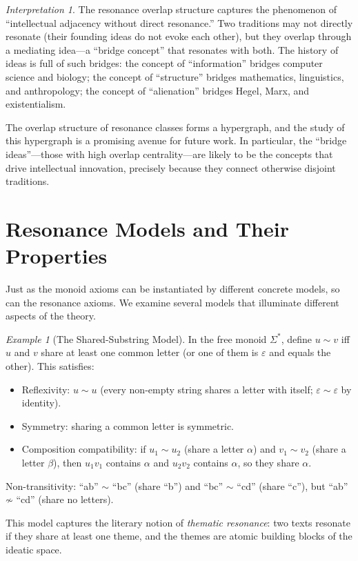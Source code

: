\documentclass[11pt,openany]{book}
\theoremstyle{definition}
\theoremstyle{plain}
\theoremstyle{remark}
\newtheorem{example}[axiom]{Example}
\newtheorem{interpretation}[axiom]{Interpretation}
\newcommand{\res}{\sim}                      %
\begin{document}
\begin{interpretation}
The resonance overlap structure captures the phenomenon of ``intellectual adjacency without direct resonance.'' Two traditions may not directly resonate (their founding ideas do not evoke each other), but they overlap through a mediating idea---a ``bridge concept'' that resonates with both. The history of ideas is full of such bridges: the concept of ``information'' bridges computer science and biology; the concept of ``structure'' bridges mathematics, linguistics, and anthropology; the concept of ``alienation'' bridges Hegel, Marx, and existentialism.

The overlap structure of resonance classes forms a hypergraph, and the study of this hypergraph is a promising avenue for future work. In particular, the ``bridge ideas''---those with high overlap centrality---are likely to be the concepts that drive intellectual innovation, precisely because they connect otherwise disjoint traditions.
\end{interpretation}

\section{Resonance Models and Their Properties}

Just as the monoid axioms can be instantiated by different concrete models, so can the resonance axioms. We examine several models that illuminate different aspects of the theory.

\begin{example}[The Shared-Substring Model]
In the free monoid $\Sigma^*$, define $u \res v$ iff $u$ and $v$ share at least one common letter (or one of them is $\varepsilon$ and equals the other). This satisfies:
\begin{itemize}
\item Reflexivity: $u \res u$ (every non-empty string shares a letter with itself; $\varepsilon \res \varepsilon$ by identity).
\item Symmetry: sharing a common letter is symmetric.
\item Composition compatibility: if $u_1 \res u_2$ (share a letter $\alpha$) and $v_1 \res v_2$ (share a letter $\beta$), then $u_1 v_1$ contains $\alpha$ and $u_2 v_2$ contains $\alpha$, so they share $\alpha$.
\end{itemize}
Non-transitivity: ``ab'' $\res$ ``bc'' (share ``b'') and ``bc'' $\res$ ``cd'' (share ``c''), but ``ab'' $\not\res$ ``cd'' (share no letters).

This model captures the literary notion of \emph{thematic resonance}: two texts resonate if they share at least one theme, and the themes are atomic building blocks of the ideatic space.
\end{example}
\end{document}
